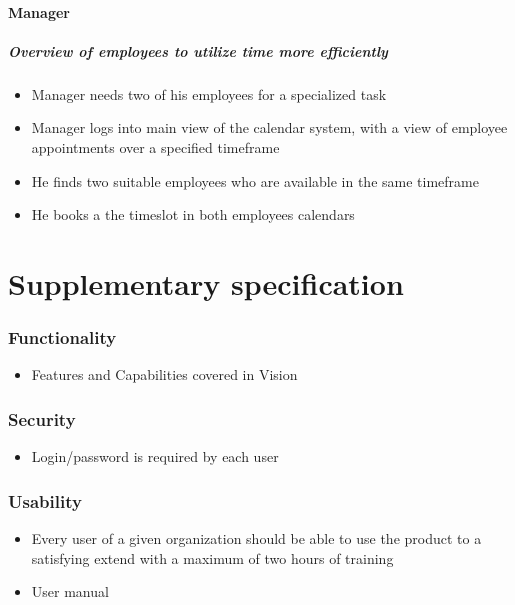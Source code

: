 \documentclass[10pt]{article}
\begin{document}
\subsection{Manager}

\subsubsection{Overview of employees to utilize time more efficiently}

\begin{itemize}
\item Manager needs two of his employees for a specialized task 
\item Manager logs into main view of the calendar system, with a view of employee appointments over a specified timeframe 
\item He finds two suitable employees who are available in the same timeframe 
\item He books a the timeslot in both employees calendars
\end{itemize}


\part{Supplementary specification}
\section{Functionality}
\begin{itemize}
\item Features and Capabilities covered in Vision 
\end{itemize}


\section{Security}
\begin{itemize}
\item Login/password is required by each user
\end{itemize}

\section{Usability}

\begin{itemize}
\item Every user of a given organization should be able to use the product to a satisfying extend with a maximum of two hours of training
\item User manual
\end{itemize}
\end{document}
